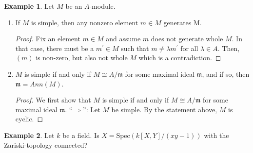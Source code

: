 \documentclass[a4paper]{book}
\theoremstyle{definition}
\newtheorem{example}{Example}[definition]
\begin{document}
\begin{example}
    Let \(M\) be an \(A\)-module.
    \begin{enumerate}
        \item If \(M\) is simple, then any nonzero element \(m \in M\) generates M.
        \begin{proof}
            Fix an element \(m \in M\) and assume \(m\) does not generate whole \(M\). In that case, there must be a \(m^\prime \in M\) such that \(m \neq \lambda m^\prime\) for all \(\lambda \in A\). Then, \((m)\) is non-zero, but also not whole \(M\) which is a contradiction.
        \end{proof}
        \item \(M\) is simple if and only if \(M \cong A / \mathfrak{m}\) for some maximal ideal \(\mathfrak{m}\), and if so, then \(\mathfrak{m} = Ann(M)\).
        \begin{proof}
            We first show that \(M\) is simple if and only if \(M \cong A/\mathfrak{m}\) for some maximal ideal \(\mathfrak{m}\).
            ``\(\Rightarrow\)'': Let \(M\) be simple. By the statement above, \(M\) is cyclic.
        \end{proof}
       \end{enumerate}
\end{example}


\begin{example}
    Let \(k\) be a field. Is \(X = \mathrm{Spec}(k[X, Y] / (xy - 1))\) with the Zariski-topology connected?
\end{example}
\end{document}

